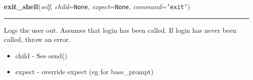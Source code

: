     \label{shutit_global:ShutIt:logout}

    \vspace{0.5ex}

\hspace{.8\funcindent}\begin{boxedminipage}{\funcwidth}

    \raggedright \textbf{exit\_shell}(\textit{self}, \textit{child}={\tt None}, \textit{expect}={\tt None}, \textit{command}={\tt \texttt{'}\texttt{exit}\texttt{'}})

    \vspace{-1.5ex}

    \rule{\textwidth}{0.5\fboxrule}
\setlength{\parskip}{2ex}
    Logs the user out. Assumes that login has been called. If login has 
    never been called, throw an error.

    \begin{itemize}
    \setlength{\parskip}{0.6ex}
      \item child              - See send()

      \item expect             - override expect (eg for base\_prompt)

    \end{itemize}

\setlength{\parskip}{1ex}
    \end{boxedminipage}

    \label{shutit_global:ShutIt:setup_prompt}

    \vspace{0.5ex}

